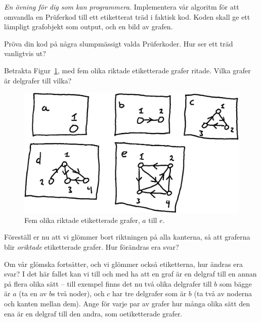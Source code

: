 \documentclass[nobib]{tufte-handout}
\begin{document}
\begin{xca}
    \emph{En övning för dig som kan programmera.} Implementera vår algoritm för att omvandla en Prüferkod till ett etiketterat träd i faktisk kod. Koden skall ge ett lämpligt grafobjekt som output, och en bild av grafen.

    Pröva din kod på några slumpmässigt valda Prüferkoder. Hur ser ett träd vanligtvis ut?
\end{xca}

\begin{xca}
    Betrakta Figur~\ref{fig:five_graphs_for_exercise}, med fem olika riktade etiketterade grafer ritade. Vilka grafer är delgrafer till vilka?

    \begin{figure}
        \centering
        \includegraphics[width=\textwidth]{graphics/five_graphs_for_exercise.png}
        \caption{Fem olika riktade etiketterade grafer, $a$ till $e$.}
        \label{fig:five_graphs_for_exercise}
    \end{figure}

    Föreställ er nu att vi glömmer bort riktningen på alla kanterna, så att graferna blir \emph{oriktade} etiketterade grafer. Hur förändras era svar?

    Om vår glömska fortsätter, och vi glömmer också etiketterna, hur ändras era svar? I det här fallet kan vi till och med ha att en graf är en delgraf till en annan på flera olika sätt -- till exempel finns det nu två olika delgrafer till $b$ som bägge är $a$ (ta en av $b$s två noder), och $c$ har tre delgrafer som är $b$ (ta två av noderna och kanten mellan dem). Ange för varje par av grafer hur många olika sätt den ena är en delgraf till den andra, som oetiketterade grafer.
\end{xca}
\end{document}
